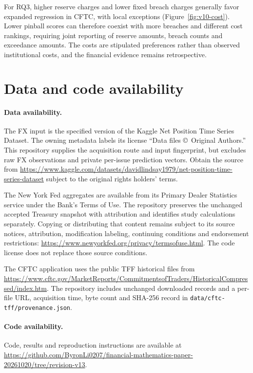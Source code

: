 \documentclass[11pt,a4paper]{article}
\begin{document}
For RQ3, higher reserve charges and lower fixed breach charges generally favor expanded regression in CFTC, with local exceptions (Figure~\ref{fig:v10-cost}). Lower pinball scores can therefore coexist with more breaches and different cost rankings, requiring joint reporting of reserve amounts, breach counts and exceedance amounts. The costs are stipulated preferences rather than observed institutional costs, and the financial evidence remains retrospective.

\FloatBarrier

\section*{Data and code availability}
\paragraph{Data availability.} The FX input is the specified version of the Kaggle Net Position Time Series Dataset. The owning metadata labels its license ``Data files \copyright\ Original Authors.'' This repository supplies the acquisition route and input fingerprint, but excludes raw FX observations and private per-issue prediction vectors. Obtain the source from \url{https://www.kaggle.com/datasets/davidlindsay1979/net-position-time-series-dataset} subject to the original rights holders' terms.

The New York Fed aggregates are available from its Primary Dealer Statistics service under the Bank's Terms of Use. The repository preserves the unchanged accepted Treasury snapshot with attribution and identifies study calculations separately. Copying or distributing that content remains subject to its source notices, attribution, modification labeling, continuing conditions and endorsement restrictions: \url{https://www.newyorkfed.org/privacy/termsofuse.html}. The code license does not replace those source conditions.

The CFTC application uses the public TFF historical files from \url{https://www.cftc.gov/MarketReports/CommitmentsofTraders/HistoricalCompressed/index.htm}. The repository includes unchanged downloaded records and a per-file URL, acquisition time, byte count and SHA-256 record in \texttt{data/cftc-tff/provenance.json}.

\paragraph{Code availability.} Code, results and reproduction instructions are available at \url{https://github.com/ByronLi0207/financial-mathematics-paper-20261020/tree/revision-v13}.
\end{document}
